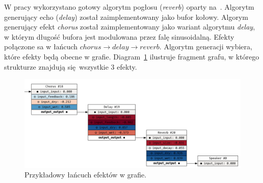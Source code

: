 W pracy wykorzystano gotowy algorytm pogłosu (\textit{reverb}) oparty na~\cite{reverb}.
Algorytm generujący echo (\textit{delay}) został zaimplementowany jako bufor kołowy.
Algorym generujący efekt \textit{chorus} został zaimplementowany jako wariant algorytmu \textit{delay},
w którym długość bufora jest modulowana przez falę sinusoidalną. Efekty połączone sa w łańcuch
$chorus \rightarrow delay \rightarrow reverb$. Algorytm generacji wybiera, które efekty będą obecne w grafie.
Diagram~\ref{fig:example_generated_effects} ilustruje fragment grafu,
w którego strukturze znajdują się wszystkie 3 efekty.

\begin{figure}[H]
    \centering
    \includegraphics[width=1.0\linewidth]{rys06/example_generated_effects.png}
    \caption{
      Przykładowy łańcuch efektów w grafie.
    }\label{fig:example_generated_effects}
\end{figure}
